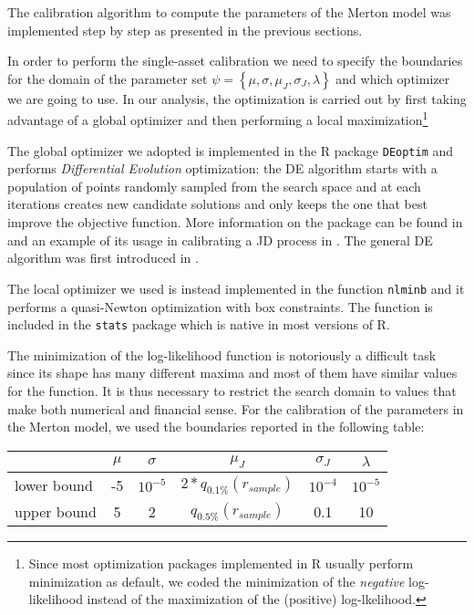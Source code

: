The calibration algorithm to compute the parameters of the Merton model was implemented step by step as presented in the previous sections.

In order to perform the single-asset calibration we need to specify the boundaries for the domain of the parameter set $\psi =  \left\{ \mu, \sigma, \mu_J, \sigma_J, \lambda \right\}$ and which optimizer we are going to use.
In our analysis, the optimization is carried out by first taking advantage of a global optimizer and then performing a local maximization\footnote{Since most optimization packages implemented in R usually perform minimization as default, we coded the minimization of the \textit{negative} log-likelihood instead of the maximization of the (positive) log-lkelihood.}

The global optimizer we adopted is implemented in the R package \texttt{DEoptim} and performs \textit{Differential Evolution} optimization: the DE algorithm starts with a population of points randomly sampled from the search space and at each iterations creates new candidate solutions and only keeps the one that best improve the objective function. More information on the package can be found in \citep{DEoptim_manual} and an example of its usage in calibrating a JD process in \citep{DEoptim_jumpdiffusion}. The general DE algorithm was first introduced in \citep{DEoptim_book}.

The local optimizer we used is instead implemented in the function \texttt{nlminb} and it performs a quasi-Newton optimization with box constraints. The function is included in the \texttt{stats} package which is native in most versions of R.

The minimization of the log-likelihood function is notoriously a difficult task since its shape has many different maxima and most of them have similar values for the function. It is thus necessary to restrict the search domain to values that make both numerical and financial sense.
For the calibration of the parameters in the Merton model, we used the  boundaries reported in the following table:
\bigskip

\begin{center}
	\begin{tabular}{lccccc}
		
		&$\mu$ & $\sigma$ & $\mu_J$ & $\sigma_J$ & $\lambda$ \\
		\midrule
		lower bound & -5 & $10^{-5}$ & $2*q_{0.1\%}(r_{sample})$ &$10^{-4}$ &$10^{-5}$\\
		upper bound & 5 & 2 & $q_{0.5\%}(r_{sample})$ & 0.1& 10\\
		\midrule
	\end{tabular}
\end{center}


